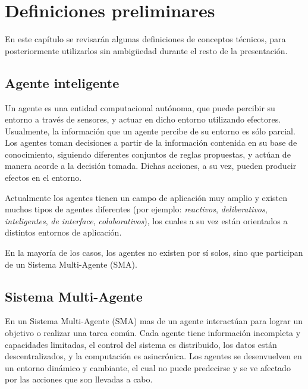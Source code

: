 
\chapter{Definiciones preliminares} 
\label{chap:definiciones_preliminares}

 En este capítulo se revisarán algunas definiciones de conceptos
 técnicos, para posteriormente utilizarlos sin ambigüedad durante el
 resto de la presentación.

\section{Agente inteligente}
 \label{sec:agente_inteligente}
 
 Un agente es una entidad computacional autónoma, que puede percibir su
 entorno a través de sensores, y actuar en dicho entorno utilizando
 efectores.
 Usualmente, la información que un agente percibe de su entorno es sólo
 parcial.
 Los agentes toman decisiones a partir de la información contenida en
 su base de conocimiento, siguiendo diferentes conjuntos de reglas
 propuestas, y actúan de manera acorde a la decisión tomada.
 Dichas acciones, a su vez, pueden producir efectos en el entorno.
 
 Actualmente los agentes tienen un campo de aplicación muy amplio y
 existen muchos tipos de agentes diferentes (por ejemplo:
 \textit{reactivos}, \textit{deliberativos}, \textit{inteligentes},
 \textit{de interface}, \textit{colaborativos}), los cuales a su vez
 están orientados a distintos entornos de aplicación.
 
 En la mayoría de los casos, los agentes no existen por sí solos, sino
 que participan de un Sistema Multi-Agente (SMA).

\section{Sistema Multi-Agente}
 \label{sec:sistema_multiagente}
 
 En un Sistema Multi-Agente (SMA) mas de un agente interactúan para
 lograr un objetivo o realizar una tarea común.
 Cada agente tiene información incompleta y capacidades limitadas, el
 control del sistema es distribuido, los datos están descentralizados,
 y la computación es asincrónica.
 Los agentes se desenvuelven en un entorno dinámico y cambiante, el
 cual no puede predecirse y se ve afectado por las acciones que son
 llevadas a cabo.
 
